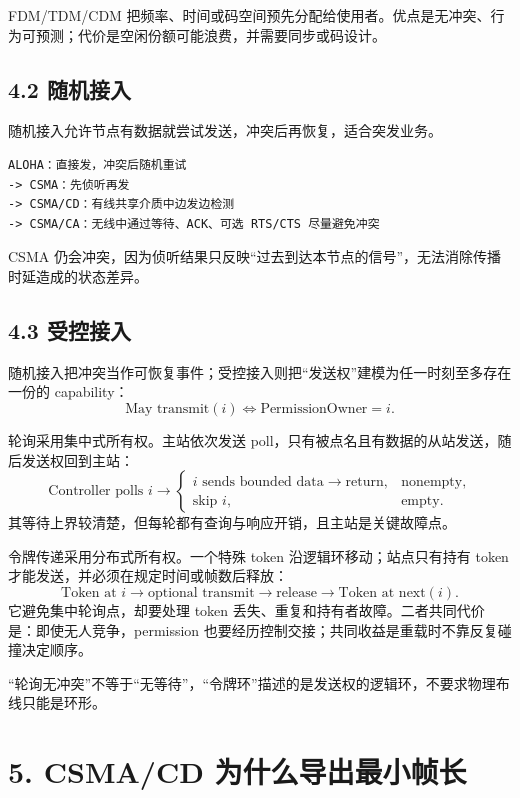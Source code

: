 \documentclass[UTF8,fontset=none,11pt,a4paper]{ctexart}
\begin{document}
FDM/TDM/CDM
把频率、时间或码空间预先分配给使用者。优点是无冲突、行为可预测；代价是空闲份额可能浪费，并需要同步或码设计。

\subsection{4.2 随机接入}\label{42-ux968fux673aux63a5ux5165}

随机接入允许节点有数据就尝试发送，冲突后再恢复，适合突发业务。

\begin{lstlisting}
ALOHA：直接发，冲突后随机重试
-> CSMA：先侦听再发
-> CSMA/CD：有线共享介质中边发边检测
-> CSMA/CA：无线中通过等待、ACK、可选 RTS/CTS 尽量避免冲突
\end{lstlisting}

CSMA
仍会冲突，因为侦听结果只反映``过去到达本节点的信号''，无法消除传播时延造成的状态差异。

\subsection{4.3 受控接入}\label{43-ux53d7ux63a7ux63a5ux5165}

随机接入把冲突当作可恢复事件；受控接入则把“发送权”建模为任一时刻至多存在一份的 capability：
\[
\boxed{\text{May transmit}(i)\iff \text{PermissionOwner}=i}.
\]

轮询采用集中式所有权。主站依次发送 poll，只有被点名且有数据的从站发送，随后发送权回到主站：
\[
\text{Controller polls }i\to
\begin{cases}
i\text{ sends bounded data}\to\text{return},&\text{nonempty},\\
\text{skip }i,&\text{empty}.
\end{cases}
\]
其等待上界较清楚，但每轮都有查询与响应开销，且主站是关键故障点。

令牌传递采用分布式所有权。一个特殊 token 沿逻辑环移动；站点只有持有 token 才能发送，并必须在规定时间或帧数后释放：
\[
\text{Token at }i\to\text{optional transmit}\to\text{release}\to\text{Token at next}(i).
\]
它避免集中轮询点，却要处理 token 丢失、重复和持有者故障。二者共同代价是：即使无人竞争，permission 也要经历控制交接；共同收益是重载时不靠反复碰撞决定顺序。

“轮询无冲突”不等于“无等待”，“令牌环”描述的是发送权的逻辑环，不要求物理布线只能是环形。

\section{5. CSMA/CD
为什么导出最小帧长}\label{5-csmacd-ux4e3aux4ec0ux4e48ux5bfcux51faux6700ux5c0fux5e27ux957f}
\end{document}
